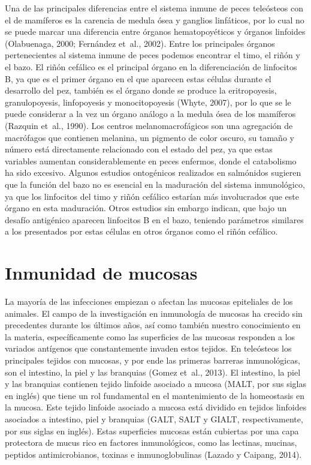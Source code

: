\documentclass[12pt,letterpaper,oneside]{scrbook}
\begin{document}
Una de las principales diferencias entre el sistema inmune de peces
teleósteos con el de mamíferos es la carencia de medula ósea y ganglios
linfáticos, por lo cual no se puede marcar una diferencia entre órganos
hematopoyéticos y órganos linfoides (Olabuenaga, 2000; Fernández et~al.,
2002). Entre los principales órganos pertenecientes al sistema inmune de
peces podemos encontrar el timo, el riñón y el bazo. El riñón cefálico
es el principal órgano en la diferenciación de linfocitos B, ya que es
el primer órgano en el que aparecen estas células durante el desarrollo
del pez, también es el órgano donde se produce la eritropoyesis,
granulopoyesis, linfopoyesis y monocitopoyesis (Whyte, 2007), por lo que
se le puede considerar a la vez un órgano análogo a la medula ósea de
los mamíferos (Razquin et~al., 1990). Los centros melanomacrofágicos son
una agregación de macrófagos que contienen melanina, un pigmento de
color oscuro, su tamaño y número está directamente relacionado con el
estado del pez, ya que estas variables aumentan considerablemente en
peces enfermos, donde el catabolismo ha sido excesivo. Algunos estudios
ontogénicos realizados en salmónidos sugieren que la función del bazo no
es esencial en la maduración del sistema inmunológico, ya que los
linfocitos del timo y riñón cefálico estarían más involucrados que este
órgano en esta maduración. Otros estudios sin embargo indican, que bajo
un desafío antigénico aparecen linfocitos B en el bazo, teniendo
parámetros similares a los presentados por estas células en otros
órganos como el riñón cefálico.

\section{Inmunidad de mucosas}

La mayoría de las infecciones empiezan o afectan las mucosas epiteliales
de los animales. El campo de la investigación en inmunología de mucosas
ha crecido sin precedentes durante los últimos años, así como también
nuestro conocimiento en la materia, específicamente como las superficies
de las mucosas responden a los variados antígenos que constantemente
invaden estos tejidos. En teleósteos los principales tejidos con
mucosas, y por ende las primeras barreras inmunológicas, son el
intestino, la piel y las branquias (Gomez et~al., 2013). El intestino,
la piel y las branquias contienen tejido linfoide asociado a mucosa
(MALT, por sus siglas en inglés) que tiene un rol fundamental en el
mantenimiento de la homeostasis en la mucosa. Este tejido linfoide
asociado a mucosa está dividido en tejidos linfoides asociados a
intestino, piel y branquias (GALT, SALT y GIALT, respectivamente, por
sus siglas en inglés). Estas superficies mucosas están cubiertas por una
capa protectora de mucus rico en factores inmunológicos, como las
lectinas, mucinas, peptidos antimicrobianos, toxinas e inmunoglobulinas
(Lazado y Caipang, 2014).
\end{document}
